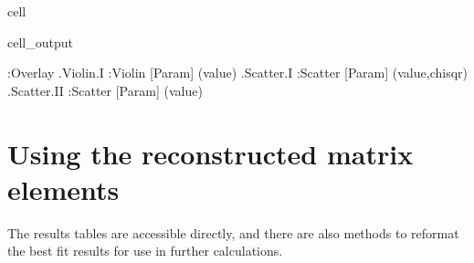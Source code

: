 \documentclass[letterpaper,table,10pt,english]{jupyterBook}
\begin{document}
\begin{sphinxuseclass}{cell}
\begin{sphinxVerbatimOutput}
\begin{sphinxuseclass}{cell_output}
\begin{sphinxVerbatim}[commandchars=\\\{\}]
:Overlay
   .Violin.I   :Violin   [Param]   (value)
   .Scatter.I  :Scatter   [Param]   (value,chisqr)
   .Scatter.II :Scatter   [Param]   (value)
\end{sphinxVerbatim}

\end{sphinxuseclass}\end{sphinxVerbatimOutput}

\end{sphinxuseclass}

\section{Using the reconstructed matrix elements}
\label{\detokenize{part2/case-study-C2H4_290723:using-the-reconstructed-matrix-elements}}
\sphinxAtStartPar
The results tables are accessible directly, and there are also methods to reformat the best fit results for use in further calculations.
\end{document}

